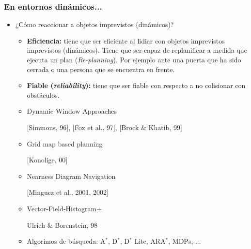 \begin{frame}
    \frametitle{En entornos dinámicos...}
    
    \begin{itemize}
        \item ¿Cómo reaccionar a objetos imprevistos (dinámicos)?
        \begin{itemize}
            \item \textbf{Eficiencia:} tiene que ser eficiente al lidiar con objetos imprevistos imprevistos (dinámicos). Tiene que ser capaz de replanificar a medida que ejecuta un plan (\emph{Re-planning}). Por ejemplo ante una puerta que ha sido cerrada o una persona que se encuentra en frente.
            \item \textbf{Fiable (\emph{reliability}):} tiene que ser fiable con respecto a no colisionar con obstáculos.
        \end{itemize}
        
        \begin{itemize}
            \item Dynamic Window Approaches
            
            {\scriptsize [Simmons, 96], [Fox et al., 97], [Brock \& Khatib, 99]}
            \item Grid map based planning
            
            {\scriptsize [Konolige, 00]}
            
            \item Nearness Diagram Navigation
            
            {\scriptsize [Minguez et al., 2001, 2002]}
            
            \item Vector-Field-Histogram+
            
            {\scriptsize Ulrich \& Borenstein, 98}
            
            \item Algorimos de búsqueda: A$^{*}$, D$^{*}$, D$^{*}$ Lite, ARA$^{*}$, MDPs, ...
        \end{itemize}
    \end{itemize}
    
\end{frame}

